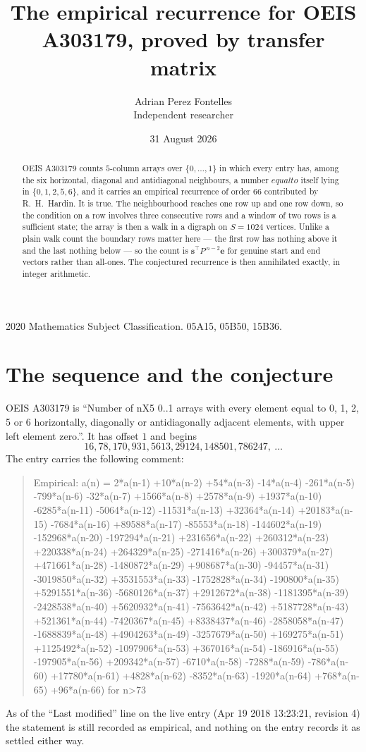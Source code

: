 \documentclass[11pt,a4paper]{article}
\title{The empirical recurrence for OEIS A303179, proved by transfer matrix}
\author{Adrian Perez Fontelles\\ \small Independent researcher}
\date{31 August 2026}
\theoremstyle{plain}
\theoremstyle{definition}
\begin{document}
\maketitle

\begin{abstract}
OEIS A303179 counts $5$-column arrays over $\{0,\dots,1\}$ in which every entry has,
among the six horizontal, diagonal and antidiagonal neighbours, a number $equal to$ itself lying in $\{0,1,2,5,6\}$, and it carries an empirical
recurrence of order $66$ contributed by R.~H.~Hardin. It is true. The neighbourhood
reaches one row up and one row down, so the condition on a row involves three consecutive
rows and a window of two rows is a sufficient state; the array is then a walk in a digraph
on $S=1024$ vertices. Unlike a plain walk count the boundary rows matter here --- the first
row has nothing above it and the last nothing below --- so the count is
$\mathbf{s}^{\!\top}P^{\,n-2}\mathbf{e}$ for genuine start and end vectors rather than
all-ones. The conjectured recurrence is then annihilated exactly, in integer arithmetic.
\end{abstract}

\noindent\small 2020 Mathematics Subject Classification. 05A15, 05B50, 15B36.\normalsize

\section{The sequence and the conjecture}

OEIS A303179 is ``Number of nX5 0..1 arrays with every element equal to 0, 1, 2, 5 or 6 horizontally, diagonally or antidiagonally adjacent elements, with upper left element zero.''. It has offset
$1$ and begins
\[
16, 78, 170, 931, 5613, 29124, 148501, 786247,\ \dots
\]
The entry carries the following comment:
\begin{quote}\small
Empirical: a(n) = 2*a(n-1) +10*a(n-2) +54*a(n-3) -14*a(n-4) -261*a(n-5) -799*a(n-6) -32*a(n-7) +1566*a(n-8) +2578*a(n-9) +1937*a(n-10) -6285*a(n-11) -5064*a(n-12) -11531*a(n-13) +32364*a(n-14) +20183*a(n-15) -7684*a(n-16) +89588*a(n-17) -85553*a(n-18) -144602*a(n-19) -152968*a(n-20) -197294*a(n-21) +231656*a(n-22) +260312*a(n-23) +220338*a(n-24) +264329*a(n-25) -271416*a(n-26) +300379*a(n-27) +471661*a(n-28) -1480872*a(n-29) +908687*a(n-30) -94457*a(n-31) -3019850*a(n-32) +3531553*a(n-33) -1752828*a(n-34) -190800*a(n-35) +5291551*a(n-36) -5680126*a(n-37) +2912672*a(n-38) -1181395*a(n-39) -2428538*a(n-40) +5620932*a(n-41) -7563642*a(n-42) +5187728*a(n-43) +521361*a(n-44) -7420367*a(n-45) +8338437*a(n-46) -2858058*a(n-47) -1688839*a(n-48) +4904263*a(n-49) -3257679*a(n-50) +169275*a(n-51) +1125492*a(n-52) -1097906*a(n-53) +367016*a(n-54) -186916*a(n-55) -197905*a(n-56) +209342*a(n-57) -6710*a(n-58) -7288*a(n-59) -786*a(n-60) +17780*a(n-61) +4828*a(n-62) -8352*a(n-63) -1920*a(n-64) +768*a(n-65) +96*a(n-66) for n>73
\end{quote}
As of the ``Last modified'' line on the live entry (Apr 19 2018 13:23:21, revision
4) the statement is still recorded as empirical, and nothing on the entry
records it as settled either way.
\end{document}
